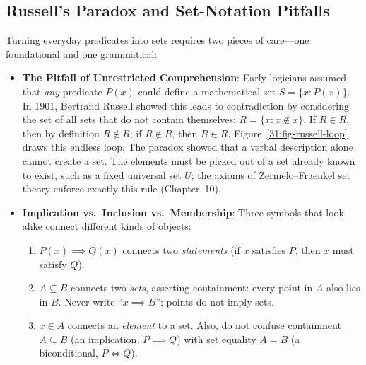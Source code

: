 \subsection{Russell's Paradox and Set-Notation Pitfalls}

Turning everyday predicates into sets requires two pieces of care---one foundational and one grammatical:

\begin{itemize}
  \item \textbf{The Pitfall of Unrestricted Comprehension}: Early logicians assumed that \emph{any} predicate $P(x)$ could define a mathematical set $S = \{x : P(x)\}$. In 1901, Bertrand Russell showed this leads to contradiction by considering the set of all sets that do not contain themselves: $R = \{x : x \notin x\}$. If $R \in R$, then by definition $R \notin R$; if $R \notin R$, then $R \in R$. Figure~\ref{31:fig-russell-loop} draws this endless loop. The paradox showed that a verbal description alone cannot create a set. The elements must be picked out of a set already known to exist, such as a fixed universal set $U$; the axioms of Zermelo--Fraenkel set theory enforce exactly this rule (Chapter~10).
  \item \textbf{Implication vs.\ Inclusion vs.\ Membership}: Three symbols that look alike connect different kinds of objects:
  \begin{enumerate}[label=(\alph*)]
    \item $P(x) \implies Q(x)$ connects two \emph{statements} (if $x$ satisfies $P$, then $x$ must satisfy $Q$).
    \item $A \subseteq B$ connects two \emph{sets}, asserting containment: every point in $A$ also lies in $B$. Never write ``$x \implies B$''; points do not imply sets.
    \item $x \in A$ connects an \emph{element} to a set. Also, do not confuse containment $A \subseteq B$ (an implication, $P \implies Q$) with set equality $A = B$ (a biconditional, $P \iff Q$).
  \end{enumerate}
\end{itemize}

